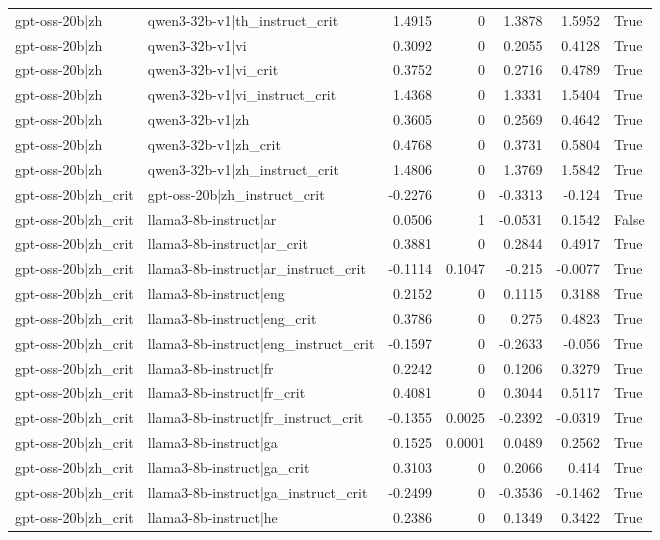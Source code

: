 \begin{table}
\begin{tabular}{l l r r r r l}
gpt-oss-20b|zh & qwen3-32b-v1|th_instruct_crit & 1.4915 & 0 & 1.3878 & 1.5952 & True \\
gpt-oss-20b|zh & qwen3-32b-v1|vi & 0.3092 & 0 & 0.2055 & 0.4128 & True \\
gpt-oss-20b|zh & qwen3-32b-v1|vi_crit & 0.3752 & 0 & 0.2716 & 0.4789 & True \\
gpt-oss-20b|zh & qwen3-32b-v1|vi_instruct_crit & 1.4368 & 0 & 1.3331 & 1.5404 & True \\
gpt-oss-20b|zh & qwen3-32b-v1|zh & 0.3605 & 0 & 0.2569 & 0.4642 & True \\
gpt-oss-20b|zh & qwen3-32b-v1|zh_crit & 0.4768 & 0 & 0.3731 & 0.5804 & True \\
gpt-oss-20b|zh & qwen3-32b-v1|zh_instruct_crit & 1.4806 & 0 & 1.3769 & 1.5842 & True \\
gpt-oss-20b|zh_crit & gpt-oss-20b|zh_instruct_crit & -0.2276 & 0 & -0.3313 & -0.124 & True \\
gpt-oss-20b|zh_crit & llama3-8b-instruct|ar & 0.0506 & 1 & -0.0531 & 0.1542 & False \\
gpt-oss-20b|zh_crit & llama3-8b-instruct|ar_crit & 0.3881 & 0 & 0.2844 & 0.4917 & True \\
gpt-oss-20b|zh_crit & llama3-8b-instruct|ar_instruct_crit & -0.1114 & 0.1047 & -0.215 & -0.0077 & True \\
gpt-oss-20b|zh_crit & llama3-8b-instruct|eng & 0.2152 & 0 & 0.1115 & 0.3188 & True \\
gpt-oss-20b|zh_crit & llama3-8b-instruct|eng_crit & 0.3786 & 0 & 0.275 & 0.4823 & True \\
gpt-oss-20b|zh_crit & llama3-8b-instruct|eng_instruct_crit & -0.1597 & 0 & -0.2633 & -0.056 & True \\
gpt-oss-20b|zh_crit & llama3-8b-instruct|fr & 0.2242 & 0 & 0.1206 & 0.3279 & True \\
gpt-oss-20b|zh_crit & llama3-8b-instruct|fr_crit & 0.4081 & 0 & 0.3044 & 0.5117 & True \\
gpt-oss-20b|zh_crit & llama3-8b-instruct|fr_instruct_crit & -0.1355 & 0.0025 & -0.2392 & -0.0319 & True \\
gpt-oss-20b|zh_crit & llama3-8b-instruct|ga & 0.1525 & 0.0001 & 0.0489 & 0.2562 & True \\
gpt-oss-20b|zh_crit & llama3-8b-instruct|ga_crit & 0.3103 & 0 & 0.2066 & 0.414 & True \\
gpt-oss-20b|zh_crit & llama3-8b-instruct|ga_instruct_crit & -0.2499 & 0 & -0.3536 & -0.1462 & True \\
gpt-oss-20b|zh_crit & llama3-8b-instruct|he & 0.2386 & 0 & 0.1349 & 0.3422 & True \\

\end{tabular}
\end{table}
